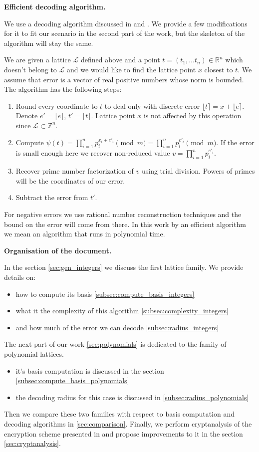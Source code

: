 \documentclass[12pt]{article}
\newcommand{\ZZ}{\mathbb{Z}}
\newcommand{\LL}{\mathcal{L}}
\begin{document}
\textbf{Efficient decoding algorithm.}

We use a decoding algorithm discussed in \cite{[DP19]} and \cite{[LLXY17]}. We provide a few modifications for it to fit our scenario in the second part of the work, but the skeleton of the algorithm will stay the same.

We are given a lattice $\LL$ defined above and a point $t = (t_1, \dots t_n) \in \mathbb{R}^{n}$ which doesn't belong to $\LL$ and we would like to find the lattice point $x$ closest to $t$. We assume that error is a vector of real positive numbers whose norm is bounded. The algorithm has the following steps:

\begin{enumerate}
    \item Round every coordinate to $t$ to deal only with discrete error $\lfloor t \rceil = x + \lfloor e \rceil$. Denote $e' = \lfloor e \rceil$, $t' = \lfloor t \rceil$. Lattice point $x$ is not affected by this operation since $\LL \subset \ZZ^{n}$.
    \item Compute $\psi(t) = \prod_{i=1}^{n}p_{i}^{x_{i} + e'_i} \pmod{m} = \prod_{i=1}^{n}p_{i}^{e'_i} \pmod{m}$. If the error is small enough here we recover non-reduced value $v = \prod_{i=1}^{n}p_{i}^{e'_i}$.
    \item Recover prime number factorization of $v$ using trial division. Powers of primes will be the coordinates of our error.
    \item Subtract the error from $t'$.
\end{enumerate}
For negative errors we use rational number reconstruction techniques and the bound on the error will come from there.
In this work by an efficient algorithm we mean an algorithm that runs in polynomial time.

\textbf{Organisation of the document.}

In the section \ref{sec:gen_integers} we discuss the first lattice family. We provide details on:
\begin{itemize}
    \item how to compute its basis \ref{subsec:compute_basis_integers}
    \item what it the complexity of this algorithm \ref{subsec:complexity_integers}
    \item and how much of the error we can decode \ref{subsec:radius_integers}
\end{itemize}
The next part of our work \ref{sec:polynomials} is dedicated to the family of polynomial lattices.
\begin{itemize}
    \item it's basis computation is discussed in the section \ref{subsec:compute_basis_polynomials}
    \item the decoding radius for this case is discussed in \ref{subsec:radius_polynomials}
\end{itemize}
Then we compare these two families with respect to basis computation and decoding algorithms in \ref{sec:comparison}. Finally, we perform cryptanalysis of the encryption scheme presented in \cite{[LLXY17]} and propose improvements to it in the section \ref{sec:cryptanalysis}.
\end{document}

